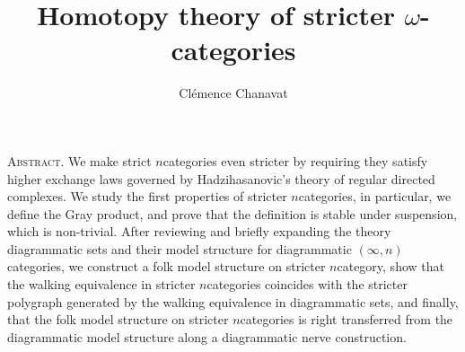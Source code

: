 \documentclass[11pt,twoside]{article}
\title{Homotopy theory of stricter $\omega$-categories}
\author{Cl\'emence Chanavat}
\begin{document}
\maketitle
\begin{center}
	\begin{minipage}[t]{.95\textwidth}
		\small\textsc{Abstract.}
		We make strict \( n \)\nbd categories even stricter by requiring they satisfy higher exchange laws governed by Hadzihasanovic's theory of regular directed complexes. 
		We study the first properties of stricter \( n \)\nbd categories, in particular, we define the Gray product, and prove that the definition is stable under suspension, which is non-trivial. 
		After reviewing and briefly expanding the theory diagrammatic sets and their model structure for diagrammatic \( (\infty, n) \)\nbd categories, we construct a folk model structure on stricter \( n \)\nbd category, show that the walking equivalence in stricter \( n \)\nbd categories coincides with the stricter polygraph generated by the walking equivalence in diagrammatic sets, and finally, that the folk model structure on stricter \( n \)\nbd categories is right transferred from the diagrammatic model structure along a diagrammatic nerve construction.
	\end{minipage}
	
	\vspace{20pt}

	\begin{minipage}[t]{0.95\textwidth}
		\setcounter{tocdepth}{2}
		\tableofcontents
	\end{minipage}
\end{center}

\makeaftertitle








\small
\end{document}
